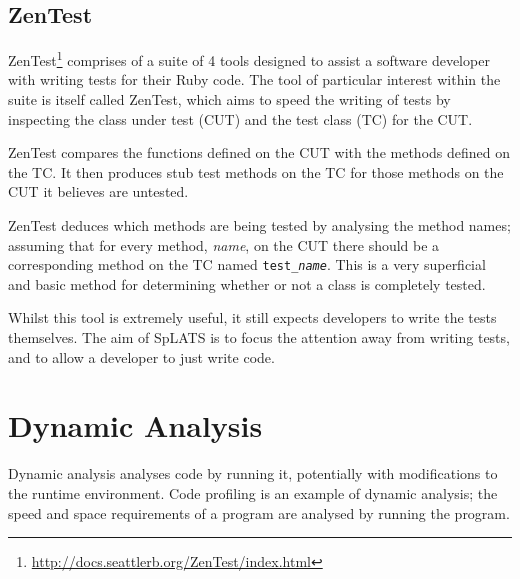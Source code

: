   \subsection{ZenTest}
    ZenTest\footnote{\url{http://docs.seattlerb.org/ZenTest/index.html}}
comprises of a suite of 4 tools designed to assist a software developer with
writing tests for their Ruby code. The tool of particular interest within the suite is itself called ZenTest,
which aims to speed the writing of tests by inspecting the class under test (CUT)
and the test class (TC) for the CUT.

    ZenTest compares the functions defined on the CUT with the methods defined
on the TC. It then produces stub test methods on the TC for those methods on the
CUT it believes are untested.

ZenTest deduces which methods are being tested by analysing the method names; assuming that for every method, \emph{name}, on the CUT there should be a corresponding method on the TC named \texttt{test\_\emph{name}}. This is a very superficial and basic method for determining whether or not a class is completely tested.

    Whilst this tool is extremely useful, it still expects developers to write
the tests themselves. The aim of SpLATS is to focus the attention away from
writing tests, and to allow a developer to just write code.
  
\section{Dynamic Analysis} 

  Dynamic analysis analyses code by running it, potentially with modifications
  to the runtime environment. Code profiling is an example of dynamic analysis;
  the speed and space requirements of a program are analysed by running the
  program.
  

